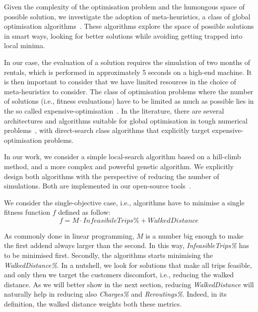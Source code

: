 Given the complexity of the optimisation problem and the humongous space of possible solution, we investigate the adoption of meta-heuristics, a class of global optimisation algorithms~\cite{RA09}. These algorithms explore the space of possible solutions in smart ways, looking for better solutions while avoiding getting trapped into local minima.

In our case, the evaluation of a solution requires the simulation of two months of rentals, which is performed in approximately 5 seconds on a high-end machine. It is then important to consider that we have limited resources in the choice of meta-heuristics to consider. 
The class of optimisation problems where the number of solutions (i.e., fitness evaluations) have to be limited as much as possible lies in the so called expensive-optimisation~\cite{RA09,FP09}. 
In the literature, there are several architectures and algorithms suitable for global optimisation in tough numerical problems~\cite{FP09}, with direct-search class algorithms that explicitly target expensive-optimisation problems. %

In our work, we consider a simple local-search algorithm based on a hill-climb method, and a more complex and powerful genetic algorithm. We explicitly design both algorithms with the perspective of reducing the number of simulations. Both are implemented in our open-source tools~\cite{MicheleGithub}.

We consider the single-objective case, i.e., algorithms have to minimise a single fitness function $f$ defined as follow:
$$f = M \cdot InfeasibileTrips\% + WalkedDistance$$

As commonly done in linear programming, $M$ is a number big enough to make the first addend always larger than the second.
In this way, \textit{InfeasibleTrips\%} has to be minimised first. Secondly, the algorithms starts minimising the \textit{WalkedDistance\%}. In a nutshell, we look for solutions that make all trips feasible, and only then we target the customers discomfort, i.e., reducing the walked distance. 
As we will better show in the next section, reducing \textit{WalkedDistance} will naturally help in reducing also \textit{Charges\%} and \textit{Reroutings\%}. Indeed, in its definition, the walked distance weights both these metrics.



